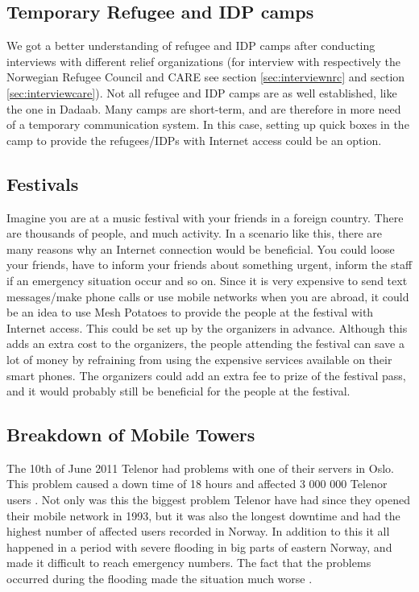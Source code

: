 \subsection{Temporary Refugee and IDP camps}
We got a better understanding of refugee and IDP camps after conducting interviews with different relief organizations (for interview with respectively the Norwegian Refugee Council and CARE see section \ref{sec:interviewnrc} and section \ref{sec:interviewcare}). 
Not all refugee and IDP camps are as well established, like the one in Dadaab. Many camps are short-term, and are therefore in more need of a temporary communication system. In this case, setting up \gls{quick} boxes in the camp to provide the refugees/IDPs with Internet access could be an option. 

\subsection{Festivals}
Imagine you are at a music festival with your friends in a foreign country. There are thousands of people, and much activity. In a scenario like this, there are many reasons why an Internet connection would be beneficial. You could loose your friends, have to inform your friends about something urgent, inform the staff if an emergency situation occur and so on. Since it is very expensive to send text messages/make phone calls or use mobile networks when you are abroad, it could be an idea to use Mesh Potatoes to provide the people at the festival with Internet access. This could be set up by the organizers in advance. Although this adds an extra cost to the organizers, the people attending the festival can save a lot of money by refraining from using the expensive services available on their smart phones. The organizers could add an extra fee to prize of the festival pass, and it would probably still be beneficial for the people at the festival. 

\subsection{Breakdown of Mobile Towers}

The 10th of June 2011 Telenor had problems with one of their servers in Oslo. This problem caused a down time of 18 hours and affected 3 000 000 Telenor users \cite{listeNedetid}. Not only was this the biggest problem Telenor have had since they opened their mobile network in 1993, but it was also the longest downtime and had the highest number of affected users recorded in Norway. In addition to this it all happened in a period with severe flooding in big parts of eastern Norway, and made it difficult to reach emergency numbers. The fact that the problems occurred during the flooding made the situation much worse \cite{TelenorNede}.
